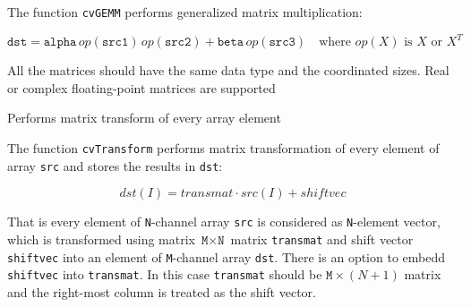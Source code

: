\begin{description}
\end{description}

The function \texttt{cvGEMM} performs generalized matrix multiplication:

\[
\texttt{dst} = \texttt{alpha} \, op(\texttt{src1}) \, op(\texttt{src2}) + \texttt{beta} \, op(\texttt{src3}) \quad \text{where $op(X)$ is $X$ or $X^T$}
\]

All the matrices should have the same data type and the coordinated sizes. Real or complex floating-point matrices are supported


Performs matrix transform of every array element


\begin{description}
\end{description}

The function \texttt{cvTransform} performs matrix transformation of every element of array \texttt{src} and stores the results in \texttt{dst}:

\[
dst(I) = transmat \cdot src(I) + shiftvec %
\]

That is every element of \texttt{N}-channel array \texttt{src} is
considered as \texttt{N}-element vector, which is transformed using
matrix $\texttt{M} \times \texttt{N}$ matrix \texttt{transmat} and shift
vector \texttt{shiftvec} into an element of \texttt{M}-channel array
\texttt{dst}. There is an option to embedd \texttt{shiftvec} into
\texttt{transmat}. In this case \texttt{transmat} should be $\texttt{M}
\times (N+1)$ matrix and the right-most column is treated as the shift
vector.

